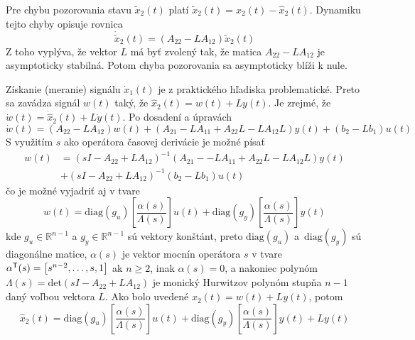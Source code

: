 \documentclass[a4paper, 10pt, ]{article}
\begin{document}
Pre chybu pozorovania stavu $\tilde{x}_2(t)$ platí $\tilde{x}_2(t) = x_2(t) - \hat{x}_2(t)$. Dynamiku tejto chyby opisuje rovnica
\begin{equation}
	\dot{\tilde{x}}_2(t) = \left( A_{22} - L A_{12} \right) \tilde{x}_2(t)
\end{equation}
Z toho vyplýva, že vektor $L$ má byť zvolený tak, že matica $ A_{22} - L A_{12} $ je asymptoticky stabilná. Potom chyba pozorovania sa asymptoticky blíži k nule.

Získanie (meranie) signálu $\dot{x}_1(t)$ je z praktického hľadiska problematické. Preto sa zavádza signál $w(t)$ taký, že $\hat{x}_2(t) = w(t) + L y(t)$. Je zrejmé, že~$\dot{w}(t) = \dot{\hat{x}}_2(t) + L \dot{y}(t)$. Po dosadení a úpravách
\begin{equation}
	\dot{w}(t) =
	\left( A_{22} - L A_{12} \right) w(t)
	 +
	\left( A_{21} - L A_{11} + A_{22} L - L A_{12} L \right) y(t)
	 +
	\left( b_2 - L b_1 \right) u(t)
\end{equation}
S využitím $s$ ako operátora časovej derivácie je možné písať
\begin{equation}
	\begin{split}
		w(t)& =
			\left( sI - A_{22} + L A_{12} \right)^{-1}
			\left( A_{21} -  \right.   \left. - L A_{11} + A_{22} L - L A_{12} L \right) y(t)
						\\ & +
			\left( sI - A_{22} + L A_{12} \right)^{-1}
			\left( b_2 - L b_1 \right) u(t)
	\end{split}
\end{equation}
čo je možné vyjadriť aj v tvare
\begin{equation}
	w(t) =
	\text{diag}(g_u) \left[ \frac{\alpha(s)}{\Lambda(s)} \right] u(t)
	+
	\text{diag}(g_y) \left[ \frac{\alpha(s)}{\Lambda(s)} \right] y(t)
\end{equation}
kde $g_u \in \mathbb{R}^{n-1}$ a $g_y \in \mathbb{R}^{n-1}$ sú  vektory konštánt, preto $\text{diag}(g_u)$ a~$\text{diag}(g_y)$ sú diagonálne matice, $\alpha(s)$ je vektor mocnín operátora $s$ v tvare $\alpha^{\mathsf{T}}(s) = \begin{bmatrix} s^{n-2}, \ldots,s, 1 \end{bmatrix}$ ak $n\geq 2$, inak $\alpha(s) = 0$, a nakoniec polynóm $\Lambda(s) = \text{det}\left( sI - A_{22} + L A_{12} \right)$ je monický Hurwitzov polynóm stupňa $n-1$ daný voľbou vektora $L$. Ako bolo uvedené $\hat{x}_2(t) = w(t) + L y(t)$, potom
\begin{equation}
	\hat{x}_2(t) =
	\text{diag}(g_u) \left[ \frac{\alpha(s)}{\Lambda(s)} \right] u(t)
	+
	\text{diag}(g_y) \left[ \frac{\alpha(s)}{\Lambda(s)} \right] y(t)
	+ L y(t)
\end{equation}
\end{document}
